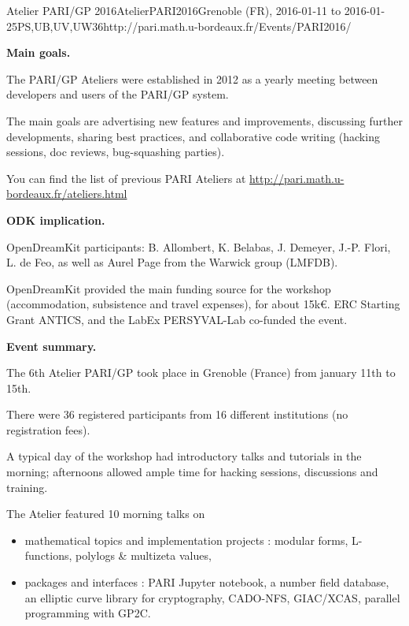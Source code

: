 \begin{event}{Atelier PARI/GP 2016}{AtelierPARI2016}{Grenoble (FR),
2016-01-11 to 2016-01-25}{PS,UB,UV,UW}{36}{http://pari.math.u-bordeaux.fr/Events/PARI2016/}

\textbf{Main goals.}

The PARI/GP Ateliers were established in 2012 as a yearly meeting
between developers and users of the PARI/GP system.

The main goals are advertising new features and improvements,
discussing further developments, sharing best practices, and collaborative
code writing (hacking sessions, doc reviews, bug-squashing parties).

You can find the list of previous PARI Ateliers at
\url{http://pari.math.u-bordeaux.fr/ateliers.html}

\textbf{ODK implication.} 

OpenDreamKit participants: B. Allombert, K. Belabas, J. Demeyer, J.-P. Flori,
L. de Feo, as well as Aurel Page from the Warwick group (LMFDB).

OpenDreamKit provided the main funding source for the workshop (accommodation,
subsistence and travel expenses), for about 15k\euro. ERC Starting Grant
ANTICS, and the LabEx PERSYVAL-Lab co-funded the event.

\textbf{Event summary.} 

The 6th Atelier PARI/GP took place in Grenoble (France) from january
11th to 15th.

There were 36 registered participants from 16 different institutions
(no registration fees).

A typical day of the workshop had introductory talks and tutorials
in the morning; afternoons allowed ample time for hacking sessions,
discussions and training.

The Atelier featured 10 morning talks on

\begin{itemize}
\item mathematical topics and implementation projects : modular forms,
    L-functions, polylogs \& multizeta values,

\item packages and interfaces : PARI Jupyter notebook, a number field database,
    an elliptic curve library for cryptography, CADO-NFS, GIAC/XCAS,
    parallel programming with GP2C.
\end{itemize}


\end{event}
